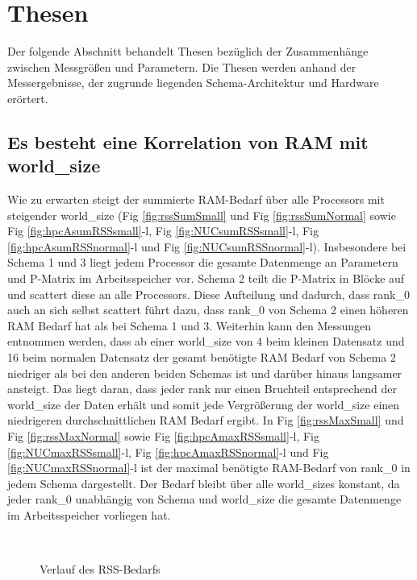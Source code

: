 \section{Thesen}
\label{sec:thesen}

Der folgende Abschnitt behandelt Thesen bezüglich der Zusammenhänge zwischen Messgrößen und Parametern.
Die Thesen werden anhand der Messergebnisse, der zugrunde liegenden Schema-Architektur und Hardware erörtert.

\subsection{Es besteht eine Korrelation von RAM mit world\_size}

Wie zu erwarten steigt der summierte RAM-Bedarf über alle Processors mit steigender world\_size
(Fig \ref{fig:rssSumSmall} und Fig \ref{fig:rssSumNormal} sowie Fig \ref{fig:hpcAsumRSSsmall}-l, Fig \ref{fig:NUCsumRSSsmall}-l, Fig \ref{fig:hpcAsumRSSnormal}-l und Fig \ref{fig:NUCsumRSSnormal}-l).
Insbesondere bei Schema 1 und 3 liegt jedem Processor
die gesamte Datenmenge an Parametern und P-Matrix im Arbeitsspeicher vor.
Schema 2 teilt die P-Matrix in Blöcke auf und scattert diese an alle Processors.
Diese Aufteilung und dadurch, dass rank\_0 auch an sich selbst
scattert führt dazu, dass rank\_0 von Schema 2 einen höheren RAM Bedarf hat als bei Schema 1 und 3.
Weiterhin kann den Messungen entnommen werden,
dass ab einer world\_size von 4 beim kleinen Datensatz und 16 beim normalen Datensatz
der gesamt benötigte RAM Bedarf von Schema 2 niedriger als bei den anderen beiden Schemas ist und darüber
hinaus langsamer ansteigt.
Das liegt daran, dass jeder rank nur einen Bruchteil entsprechend der world\_size der Daten erhält und somit jede Vergrößerung der
world\_size einen niedrigeren durchschnittlichen RAM Bedarf ergibt.
In Fig \ref{fig:rssMaxSmall} und Fig \ref{fig:rssMaxNormal} sowie Fig \ref{fig:hpcAmaxRSSsmall}-l, Fig \ref{fig:NUCmaxRSSsmall}-l, Fig \ref{fig:hpcAmaxRSSnormal}-l und Fig \ref{fig:NUCmaxRSSnormal}-l
ist der maximal benötigte RAM-Bedarf von rank\_0 in jedem Schema dargestellt.
Der Bedarf bleibt über alle world\_sizes konstant, da jeder rank\_0
unabhängig von Schema und world\_size die gesamte Datenmenge im Arbeitsspeicher vorliegen hat.

\begin{figure}[h]
	\\
	\caption{Verlauf des RSS-Bedarfs}
	\label{fig:NumberMeasurements}
\end{figure}

